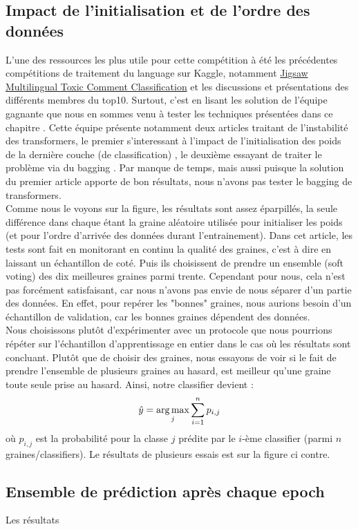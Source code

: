 \subsection{Impact de l'initialisation et de l'ordre des données}
L'une des ressources les plus utile pour cette compétition à été les précédentes compétitions de traitement du language sur Kaggle, notamment \href{https://www.kaggle.com/c/jigsaw-multilingual-toxic-comment-classification/overview}{Jigsaw Multilingual Toxic Comment Classification} et les discussions et présentations des différents membres du top10. Surtout, c'est en lisant les solution de l'équipe gagnante que nous en sommes venu à tester les techniques présentées dans ce chapitre . Cette équipe présente notamment deux articles traitant de l'instabilité des transformers, le premier s'interessant à l'impact de l'initialisation des poids de la dernière couche (de classification) , le deuxième essayant de traiter le problème via du bagging . Par manque de temps, mais aussi puisque la solution du premier article apporte de bon résultats, nous n'avons pas tester le bagging de transformers. \\
Comme nous le voyons sur la figure, les résultats sont assez éparpillés, la seule différence dans chaque étant la graine aléatoire utilisée pour initialiser les poids (et pour l'ordre d'arrivée des données durant l'entrainement). Dans cet article, les tests sont fait en monitorant en continu la qualité des graines, c'est à dire en laissant un échantillon de coté. Puis ils choisissent de prendre un ensemble (soft voting) des dix meilleures graines parmi trente. Cependant pour nous, cela n'est pas forcément satisfaisant, car nous n'avons pas envie de nous séparer d'un partie des données. En effet, pour repérer les "bonnes" graines, nous aurions besoin d'un échantillon de validation, car les bonnes graines dépendent des données. \\
Nous choisissons plutôt d'expérimenter avec un protocole que nous pourrions répéter sur l'échantillon d'apprentissage en entier dans le cas où les résultats sont concluant. Plutôt que de choisir des graines, nous essayons de voir si le fait de prendre l'ensemble de plusieurs graines au hasard, est meilleur  qu'une graine toute seule prise au hasard. Ainsi, notre classifier devient : $$ \hat y = \operatorname*{arg\,max}_j \sum_{i=1}^n p_{i,j} $$ où $p_{i,j}$ est la probabilité pour la classe $j$ prédite par le $i$-ème classifier (parmi $n$ graines/classifiers). Le résultats de plusieurs essais est sur la figure ci contre.


\subsection{Ensemble de prédiction après chaque epoch}
Les résultats 

